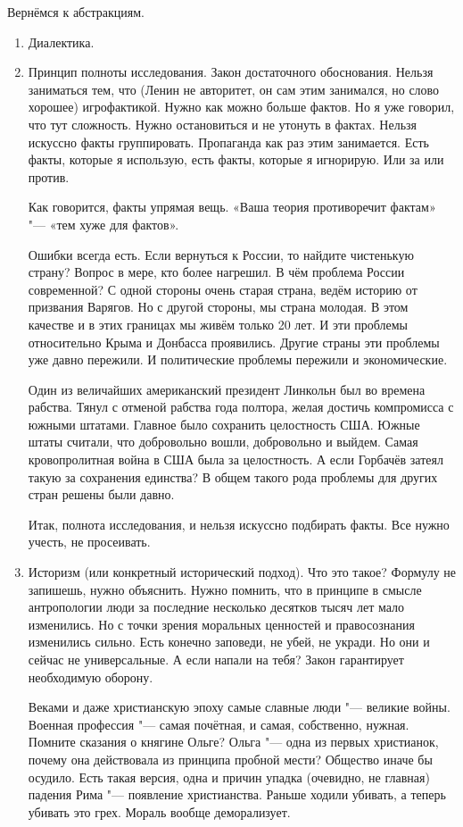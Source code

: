 Вернёмся к абстракциям.
\begin{enumerate}
\item Диалектика.
\item Принцип полноты исследования. Закон достаточного обоснования. Нельзя заниматься тем, что (Ленин не авторитет, он сам этим занимался, но слово хорошее) игрофактикой. Нужно как можно больше фактов. Но я уже говорил, что тут сложность. Нужно остановиться и не утонуть в фактах. Нельзя искуссно факты группировать. Пропаганда как раз этим занимается. Есть факты, которые я использую, есть факты, которые я игнорирую. Или за или против.

Как говорится, факты упрямая вещь. «Ваша теория противоречит фактам» "--- «тем хуже для фактов».

Ошибки всегда есть. Если вернуться к России, то найдите чистенькую страну? Вопрос в мере, кто более нагрешил. В чём проблема России современной? С одной стороны очень старая страна, ведём историю от призвания Варягов. Но с другой стороны, мы страна молодая. В этом качестве и в этих границах мы живём только 20 лет. И эти проблемы относительно Крыма и Донбасса проявились. Другие страны эти проблемы уже давно пережили. И политические проблемы пережили и экономические.

Один из величайших американский президент Линкольн был во времена рабства. Тянул с отменой рабства года полтора, желая достичь компромисса с южными штатами. Главное было сохранить целостность США. Южные штаты считали, что добровольно вошли, добровольно и выйдем. Самая кровопролитная война в США была за целостность. А если Горбачёв затеял такую за сохранения единства? В общем такого рода проблемы для других стран решены были давно.

Итак, полнота исследования, и нельзя искуссно подбирать факты. Все нужно учесть, не просеивать.

\item Историзм (или конкретный исторический подход). Что это такое? Формулу не запишешь, нужно объяснить. Нужно помнить, что в принципе в смысле антропологии люди за последние несколько десятков тысяч лет мало изменились. Но с точки зрения моральных ценностей и правосознания изменились сильно. Есть конечно заповеди, не убей, не укради. Но они и сейчас не универсальные. А если напали на тебя? Закон гарантирует необходимую оборону.

Веками и даже христианскую эпоху самые славные люди "--- великие войны. Военная профессия "--- самая почётная, и самая, собственно, нужная. Помните сказания о княгине Ольге? Ольга "--- одна из первых христианок, почему она действовала из принципа пробной мести? Общество иначе бы осудило. Есть такая версия, одна и причин упадка (очевидно, не главная) падения Рима "--- появление христианства. Раньше ходили убивать, а теперь убивать это грех. Мораль вообще деморализует.


\end{enumerate}

